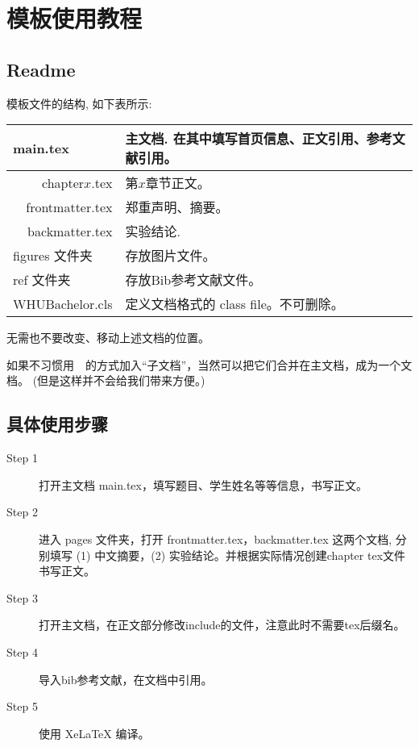\chapter{模板使用教程}
 
\section{Readme}

模板文件的结构, 如下表所示:
 \begin{table}[ht]\centering
\begin{tabular}{r|r|l}
	\hline\hline
	\multicolumn{2}{l|}{main.tex }       & 主文档. 在其中填写首页信息、正文引用、参考文献引用。             \\ \hline
                                    & chapter$x$.tex & 第$x$章节正文。             \\ \cline{2-3}
    \raisebox{1em}{pages 文件夹}   & frontmatter.tex & 郑重声明、摘要。               \\ \cline{2-3}
	 &  backmatter.tex & 实验结论.                       \\ \hline
	\multicolumn{2}{l|}{figures 文件夹}                  & 存放图片文件。                   \\ \hline
    \multicolumn{2}{l|}{ref 文件夹}                  & 存放Bib参考文献文件。                   \\ \hline
	\multicolumn{2}{l|}{WHUBachelor.cls }             & 定义文档格式的 class file。不可删除。 \\ \hline\hline
\end{tabular}
\end{table}

无需也不要改变、移动上述文档的位置。

如果不习惯用~\verb||~的方式加入“子文档”，当然可以把它们合并在主文档，成为一个文档。
({\kaishu 但是这样并不会给我们带来方便。})

 \section{具体使用步骤}

 \begin{description}
  \item[Step 1]  打开主文档 main.tex，填写题目、学生姓名等等信息，书写正文。
  \item[Step 2]  进入 pages 文件夹，打开 frontmatter.tex，backmatter.tex 这两个文档,
  分别填写 (1) 中文摘要，(2) 实验结论。并根据实际情况创建chapter tex文件书写正文。
  \item[Step 3]  打开主文档，在正文部分修改include的文件，注意此时不需要tex后缀名。
  \item[Step 4]  导入bib参考文献，在文档中引用。 
  \item[Step 5]  使用 XeLaTeX 编译。
\end{description}

